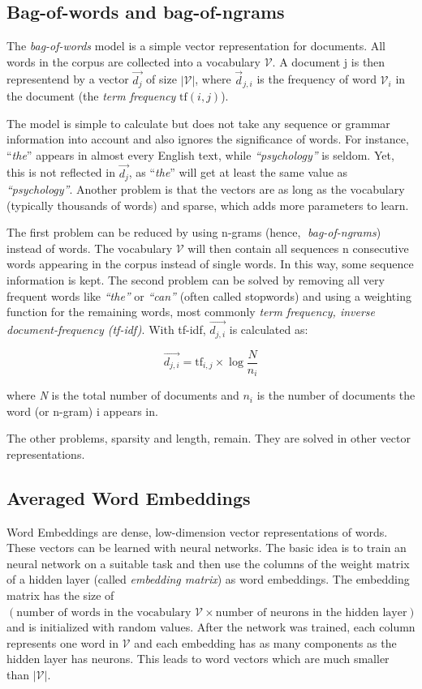 \subsection{Bag-of-words and bag-of-ngrams}
The \emph{bag-of-words} model is a simple vector representation for documents. All words in the corpus are collected into a vocabulary $\mathcal{V}$. A document j is then representend by a vector $\vec{d_j}$ of size $|\mathcal{V}|$, where $\vec{d}_{j,i}$ is the frequency of word $\mathcal{V}_i$ in the document (the \emph{term frequency} $\text{tf}(i,j)$).

The model is simple to calculate but does not take any sequence or grammar information into account and also ignores the significance of words. For instance, \enquote{\emph{the}} appears in almost every English text, while \emph{\enquote{psychology}} is seldom. Yet, this is not reflected in $\vec{d_j}$, as \enquote{\emph{the}} will get at least the same value as \emph{\enquote{psychology}}. Another problem is that the vectors are as long as the vocabulary (typically thousands of words) and sparse, which adds more parameters to learn.

The first problem can be reduced by using n-grams (hence, \emph{bag-of-ngrams}) instead of words. The vocabulary $\mathcal{V}$ will then contain all sequences n consecutive words appearing in the corpus instead of single words. In this way, some sequence information is kept. The second problem can be solved by removing all very frequent words like \emph{\enquote{the}} or \emph{\enquote{can}} (often called stopwords) and using a weighting function for the remaining words, most commonly \emph{term frequency, inverse document-frequency (tf-idf)}. With tf-idf, $\vec{d_{j,i}}$ is calculated as:

\[\vec{d_{j,i}} = \text{tf}_{i,j} \times \log{ \frac{N}{n_i} } \]

where \emph{N} is the total number of documents and $n_i$ is the number of documents the word (or n-gram) i appears in.

The other problems, sparsity and length, remain. They are solved in other vector representations.


\subsection{Averaged Word Embeddings}
Word Embeddings are dense, low-dimension vector representations of words. These vectors can be learned with neural networks. The basic idea is to train an neural network on a suitable task and then use the columns of the weight matrix of a hidden layer (called \emph{embedding matrix}) as word embeddings. The embedding matrix has the size of $(\text{number of words in the vocabulary } \mathcal{V} \times\allowbreak \text{number of neurons }\allowbreak \text{in the hidden layer})$ and is initialized with random values. After the network was trained, each column represents one word in $\mathcal{V}$ and each embedding has as many components as the hidden layer has neurons. This leads to word vectors which are much smaller than $|\mathcal{V}|$.

